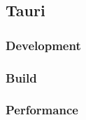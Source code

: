 \subsection{Tauri}\label{subsec:impl:tauri}

\subsubsection{Development}
\subsubsection{Build}
\subsubsection{Performance}
